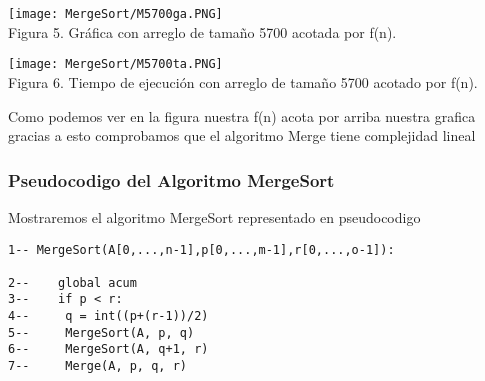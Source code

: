 \documentclass[12pt,twoside]{article}
\begin{document}
\begin{center}
    \texttt{[image: MergeSort/M5700ga.PNG]}\\
    Figura 5. Gr\'afica con arreglo de tamaño 5700 acotada por f(n).
\end{center}
\begin{center}
    \texttt{[image: MergeSort/M5700ta.PNG]}\\
    Figura 6. Tiempo de ejecuci\'on con arreglo de tamaño 5700 acotado por f(n).
\end{center}
Como podemos ver en la figura nuestra f(n) acota por arriba nuestra grafica gracias a esto comprobamos que el algoritmo Merge tiene complejidad lineal
\subsubsection{Pseudocodigo del Algoritmo MergeSort}
Mostraremos el algoritmo MergeSort representado en pseudocodigo
\begin{lstlisting}
1-- MergeSort(A[0,...,n-1],p[0,...,m-1],r[0,...,o-1]):

2--    global acum
3--    if p < r:
4--    	q = int((p+(r-1))/2)
5--    	MergeSort(A, p, q)
6--    	MergeSort(A, q+1, r)
7--    	Merge(A, p, q, r)
\end{lstlisting}
\end{document}
